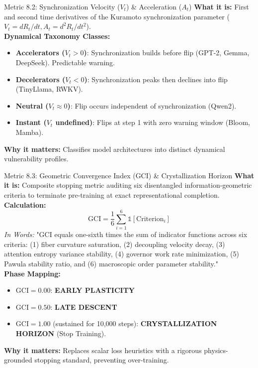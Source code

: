 \documentclass[10pt,a4paper]{article}
\begin{document}
\begin{metricbox}{Metric 8.2: Synchronization Velocity ($V_t$) \& Acceleration ($A_t$)}
\textbf{What it is:} First and second time derivatives of the Kuramoto synchronization parameter ($V_t = dR_t/dt, A_t = d^2R_t/dt^2$).\\
\textbf{Dynamical Taxonomy Classes:}
\begin{itemize}
    \item \textbf{Accelerators ($V_t > 0$)}: Synchronization builds before flip (GPT-2, Gemma, DeepSeek). Predictable warning.
    \item \textbf{Decelerators ($V_t < 0$)}: Synchronization peaks then declines into flip (TinyLlama, RWKV).
    \item \textbf{Neutral ($V_t \approx 0$)}: Flip occurs independent of synchronization (Qwen2).
    \item \textbf{Instant ($V_t$ undefined)}: Flips at step 1 with zero warning window (Bloom, Mamba).
\end{itemize}
\textbf{Why it matters:} Classifies model architectures into distinct dynamical vulnerability profiles.
\end{metricbox}

\begin{metricbox}{Metric 8.3: Geometric Convergence Index (GCI) \& Crystallization Horizon}
\textbf{What it is:} Composite stopping metric auditing six disentangled information-geometric criteria to terminate pre-training at exact representational completion.\\
\textbf{Calculation:}
$$\text{GCI} = \frac{1}{6} \sum_{i=1}^6 \mathbb{1}\left[\text{Criterion}_i\right]$$
\emph{In Words:} "GCI equals one-sixth times the sum of indicator functions across six criteria: (1) fiber curvature saturation, (2) decoupling velocity decay, (3) attention entropy variance stability, (4) governor work rate minimization, (5) Pawula stability ratio, and (6) macroscopic order parameter stability."\\
\textbf{Phase Mapping:}
\begin{itemize}
    \item $\text{GCI} = 0.00$: \textbf{EARLY PLASTICITY}
    \item $\text{GCI} = 0.50$: \textbf{LATE DESCENT}
    \item $\text{GCI} = \mathbf{1.00}$ (sustained for 10,000 steps): \textbf{CRYSTALLIZATION HORIZON} (Stop Training).
\end{itemize}
\textbf{Why it matters:} Replaces scalar loss heuristics with a rigorous physics-grounded stopping standard, preventing over-training.
\end{metricbox}
\end{document}
